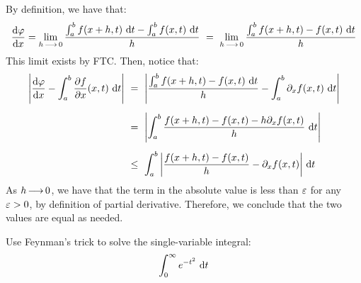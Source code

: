 \begin{soln}
    By definition, we have that:
    \begin{equation*}
        \frac{\textrm{d}\!\operatorname{\varphi}}{\textrm{d} x} = \lim_{h\operatorname{\longrightarrow}0}\frac{\int_{a}^{b}f(x+h,t)\textrm{ d} t
        - \int_{a}^{b}f(x,t)\textrm{ d} t}{h} \ = \
        \lim_{h\operatorname{\longrightarrow}0} \frac{\int_{a}^{b}f(x+h,t)-f(x,t)\textrm{ d} t}{h}
    \end{equation*}
    This limit exists by FTC. Then, notice that:
    \begin{align*}
        \abs{\frac{\d\!\vphi}{\d x} - \int_{a}^{b}\frac{\p f}{\p x}(x, t)\di t}
        \ & = \ \abs{\frac{\int_{a}^{b}f(x+h,t)-f(x,t)\di t}{h} - \int_{a}^{b}
            \p_{x} f(x,t)\di t} \vsp
        & = \ \abs{\int_{a}^{b}\frac{f(x+h,t)-f(x,t)-h\p_{x}f(x,t)}{h}\di t} \vsp
        & \leq \ \int_{a}^{b}\abs{\frac{f(x+h,t)-f(x,t)}{h} - \p_{x}f(x,t)} \di t
    \end{align*}
    As $ h \operatorname{\longrightarrow} 0 $, we have that the term in the absolute value is less than
    $ \operatorname{\varepsilon} $ for any $ \operatorname{\varepsilon} > 0 $, by definition of partial derivative. Therefore,
    we conclude that the two values are equal as needed.
\end{soln}

\begin{qu}[num=27.3]
    Use Feynman's trick to solve the single-variable integral:
    \begin{equation*}
        \int_{0}^{\infty} e^{-t^{2}} \textrm{ d} t
    \end{equation*}
\end{qu}


